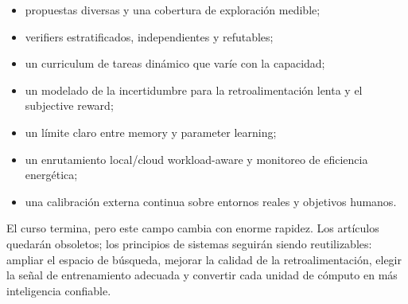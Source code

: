 \documentclass[a4paper]{article}
\begin{document}
\begin{itemize}
    \item propuestas diversas y una cobertura de exploración medible;
    \item verifiers estratificados, independientes y refutables;
    \item un curriculum de tareas dinámico que varíe con la capacidad;
    \item un modelado de la incertidumbre para la retroalimentación lenta y el subjective reward;
    \item un límite claro entre memory y parameter learning;
    \item un enrutamiento local/cloud workload-aware y monitoreo de eficiencia energética;
    \item una calibración externa continua sobre entornos reales y objetivos humanos.
\end{itemize}

El curso termina, pero este campo cambia con enorme rapidez. Los artículos quedarán obsoletos; los principios de sistemas seguirán siendo reutilizables: ampliar el espacio de búsqueda, mejorar la calidad de la retroalimentación, elegir la señal de entrenamiento adecuada y convertir cada unidad de cómputo en más inteligencia confiable.
\end{document}
